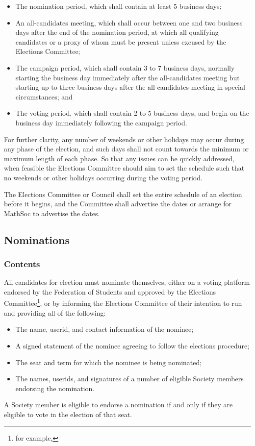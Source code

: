 \begin{itemize}
	\item The nomination period, which shall contain at least 5 business days;
	\item An all-candidates meeting, which shall occur between one and two business days after the end of the nomination period, at which all qualifying candidates or a proxy of whom must be present unless excused by the Elections Committee;
	\item The campaign period, which shall contain 3 to 7 business days, normally starting the business day immediately after the all-candidates meeting but starting up to three business days after the all-candidates meeting in special circumstances; and
	\item The voting period, which shall contain 2 to 5 business days, and begin on the business day immediately following the campaign period.
\end{itemize}
For further clarity, any number of weekends or other holidays may occur during any phase of the election, and such days shall not count towards the minimum or maximum length of each phase.
So that any issues can be quickly addressed, when feasible the Elections Committee should aim to set the schedule such that no weekends or other holidays occurring during the voting period.

The Elections Committee or Council shall set the entire schedule of an election before it begins, and the Committee shall advertise the dates or arrange for MathSoc to advertise the dates.

\subsection{Nominations}
\subsubsection{Contents}
All candidates for election must nominate themselves, either on a voting platform endorsed by the Federation of Students and approved by the Elections Committee\footnote{for example, \votewebsite}, or by informing the Elections Committee of their intention to run and providing all of the following:
		\begin{itemize}
			\item The name, userid, and contact information of the nominee;
			\item A signed statement of the nominee agreeing to follow the elections
				procedure;
			\item The seat and term for which the nominee is being nominated;
			\item The names, userids, and signatures of a number of eligible Society members endorsing the nomination.
		\end{itemize}
A Society member is eligible to endorse a nomination if and only if they are eligible to vote in the election of that seat.
		
